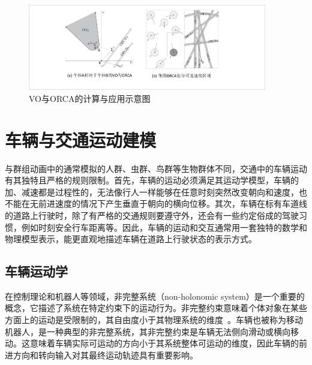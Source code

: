 \begin{figure}[!tbh]
\centering
\includegraphics[width=0.93\textwidth]{figure/intro/orca v2.pdf}
\caption[VO与ORCA的计算与应用示意图]{
VO与ORCA的计算与应用示意图
}
\label{fig:intro_orca}
\end{figure}








\section{车辆与交通运动建模}

\label{section:intro_vehiclemove}

与群组动画中的通常模拟的人群、虫群、鸟群等生物群体不同，交通中的车辆运动有其独特且严格的规则限制。首先，车辆的运动必须满足其运动学模型，车辆的加、减速都是过程性的，无法像行人一样能够在任意时刻突然改变朝向和速度，也不能在无前进速度的情况下产生垂直于朝向的横向位移。其次，车辆在标有车道线的道路上行驶时，除了有严格的交通规则要遵守外，还会有一些约定俗成的驾驶习惯，例如时刻安全行车距离等。因此，车辆的运动和交互通常用一套独特的数学和物理模型表示，能更直观地描述车辆在道路上行驶状态的表示方式。


\subsection{车辆运动学}

在控制理论和机器人等领域，非完整系统（non-holonomic system）是一个重要的概念，它描述了系统在特定约束下的运动行为。非完整约束意味着个体对象在某些方面上的运动是受限制的，其自由度小于其物理系统的维度~\cite{ne_mark2004dynamics}。车辆也被称为移动机器人，是一种典型的非完整系统，其非完整约束是车辆无法侧向滑动或横向移动。这意味着车辆实际可运动的方向小于其系统整体可运动的维度，因此车辆的前进方向和转向输入对其最终运动轨迹具有重要影响。



